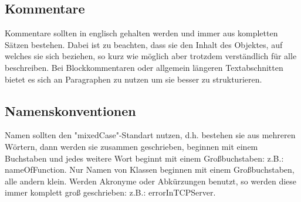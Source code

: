 \subsection{Kommentare}
Kommentare sollten in englisch gehalten werden und immer aus kompletten Sätzen bestehen. Dabei ist zu beachten, dass sie den Inhalt des Objektes, auf welches sie sich beziehen, so kurz wie möglich aber trotzdem verständlich für alle beschreiben. Bei Blockkommentaren oder allgemein längeren Textabschnitten bietet es sich an Paragraphen zu nutzen um sie besser zu strukturieren.

\subsection{Namenskonventionen}
Namen sollten den "mixedCase"-Standart nutzen, d.h. bestehen sie aus mehreren Wörtern, dann werden sie zusammen geschrieben, beginnen mit einem Buchstaben und jedes weitere Wort beginnt mit einem Großbuchstaben: z.B.: nameOfFunction. Nur Namen von Klassen beginnen mit einem Großbuchstaben, alle andern klein. Werden Akronyme oder Abkürzungen benutzt, so werden diese immer komplett groß geschrieben: z.B.: errorInTCPServer.